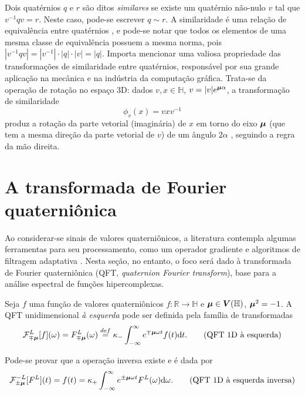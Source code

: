 Dois quat\'ernios $ q $ e $ r $ s\~ao ditos \emph{similares} se existe um quat\'ernio n\~ao-nulo $ v $ tal que $ v^{-1}q v = r $. Neste caso, pode-se escrever $ q \sim r $. A similaridade \'e uma rela\c c\~ao de equival\^encia entre quat\'ernios \cite{zhang1997quaternions}, e pode-se notar que todos os elementos de uma mesma classe de equival\^encia possuem a mesma norma, pois $ |v^{-1}q v| = |v^{-1}| \cdot |q| \cdot |v| = |q| $. Importa mencionar uma valiosa propriedade das transforma\c c\~oes de similaridade entre quat\'ernios, respons\'avel por sua grande aplica\c c\~ao na mec\^anica e na ind\'ustria da computa\c c\~ao gr\'afica. Trata-se da opera\c c\~ao de rota\c c\~ao no espa\c co 3D: dados $ v,x \in \mathbb{H} $, $ v = |v| e^{\boldsymbol{\mu} \alpha}$, a transforma\c c\~ao de similaridade
\begin{equation}
\label{eq:rotacao}
\phi_v(x) = v x v^{-1}
\end{equation}
produz a rota\c c\~ao da parte vetorial (imagin\'aria) de $ x $ em torno do eixo $ \boldsymbol{\mu} $ (que tem a mesma dire\c c\~ao da parte vetorial de $ v $) de um \^angulo $ 2\alpha $ \cite{ward2012quaternions}, seguindo a regra da m\~ao direita.

\section{A transformada de Fourier quaterni\^onica}
\label{sec:QFT}

Ao considerar-se sinais de valores quaterni\^onicos, a literatura contempla algumas ferramentas para seu processamento, como um operador gradiente \cite{jiang2014general} e algoritmos de filtragem adaptativa \cite{jiang2013frequency}. Nesta se\c c\~ao, no entanto, o foco ser\'a dado \`a transformada de Fourier quaterni\^onica (QFT, \emph{quaternion Fourier transform}), base para a an\'alise espectral de fun\c c\~oes hipercomplexas.

Seja $f$ uma fun\c c\~ao de valores quaterni\^onicos $f: \mathbb{R} \rightarrow \mathbb{H}$ e $\boldsymbol{\mu} \in \boldsymbol{V}(\mathbb{H})$, $\boldsymbol{\mu}^2 = -1$. A QFT unidimensional \emph{\`a esquerda} pode ser definida pela fam\'ilia de transformadas
\begin{equation}
\mathcal{F}^L_{\mp \boldsymbol{\mu}}[f](\omega) = 
F^L_{\mp \boldsymbol{\mu}}(\omega) \overset{def}{=}
\kappa_{-} \int_{-\infty}^{\infty} e^{\mp \boldsymbol{\mu} \omega t} f(t) \mathrm{d}t.
\tag{QFT 1D \`a esquerda}
\end{equation}

Pode-se provar que a opera\c c\~ao inversa existe e \'e dada por
\begin{equation}
\mathcal{F}^{-L}_{\pm \boldsymbol{\mu}}[F^L](t) = 
f(t) =
\kappa_{+} \int_{-\infty}^{\infty} e^{\pm \boldsymbol{\mu} \omega t} F^L(\omega) \mathrm{d}\omega.
\tag{QFT 1D \`a esquerda inversa}
\end{equation}

